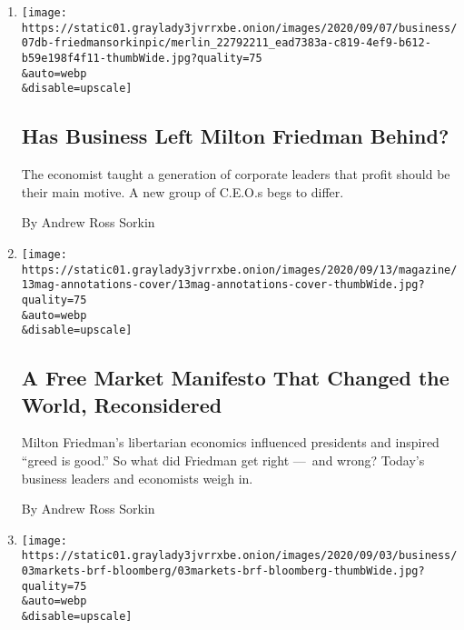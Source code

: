 \begin{enumerate}
\def\labelenumi{\arabic{enumi}.}
\item
  \href{/2020/09/11/business/dealbook/milton-friedman-anniversary-sorkin-essay.html}{}

  \texttt{[image: https://static01.graylady3jvrrxbe.onion/images/2020/09/07/business/07db-friedmansorkinpic/merlin\_22792211\_ead7383a-c819-4ef9-b612-b59e198f4f11-thumbWide.jpg?quality=75\\\&auto=webp\\\&disable=upscale]}

  \hypertarget{has-business-left-milton-friedman-behind}{%
  \subsection{Has Business Left Milton Friedman
  Behind?}\label{has-business-left-milton-friedman-behind}}

  The economist taught a generation of corporate leaders that profit
  should be their main motive. A new group of C.E.O.s begs to differ.

  By Andrew Ross Sorkin
\item
  \href{/2020/09/11/business/dealbook/milton-friedman-doctrine-social-responsibility-of-business.html}{}

  \texttt{[image: https://static01.graylady3jvrrxbe.onion/images/2020/09/13/magazine/13mag-annotations-cover/13mag-annotations-cover-thumbWide.jpg?quality=75\\\&auto=webp\\\&disable=upscale]}

  \hypertarget{a-free-market-manifesto-that-changed-the-world-reconsidered}{%
  \subsection{A Free Market Manifesto That Changed the World,
  Reconsidered}\label{a-free-market-manifesto-that-changed-the-world-reconsidered}}

  Milton Friedman's libertarian economics influenced presidents and
  inspired ``greed is good.'' So what did Friedman get right ---~and
  wrong? Today's business leaders and economists weigh in.

  By Andrew Ross Sorkin
\item
  \href{/2020/09/03/business/michael-bloomberg-gives-100-million-to-historically-black-medical-schools.html}{}

  \texttt{[image: https://static01.graylady3jvrrxbe.onion/images/2020/09/03/business/03markets-brf-bloomberg/03markets-brf-bloomberg-thumbWide.jpg?quality=75\\\&auto=webp\\\&disable=upscale]}


\end{enumerate}
